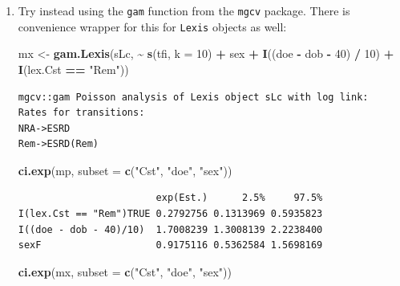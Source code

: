 \documentclass[
]{book}
\newenvironment{Shaded}{\begin{snugshade}}{\end{snugshade}}
\newcommand{\AttributeTok}[1]{\textcolor[rgb]{0.13,0.29,0.53}{#1}}
\newcommand{\DecValTok}[1]{\textcolor[rgb]{0.00,0.00,0.81}{#1}}
\newcommand{\FunctionTok}[1]{\textcolor[rgb]{0.13,0.29,0.53}{\textbf{#1}}}
\newcommand{\NormalTok}[1]{#1}
\newcommand{\OtherTok}[1]{\textcolor[rgb]{0.56,0.35,0.01}{#1}}
\newcommand{\SpecialCharTok}[1]{\textcolor[rgb]{0.81,0.36,0.00}{\textbf{#1}}}
\newcommand{\StringTok}[1]{\textcolor[rgb]{0.31,0.60,0.02}{#1}}
\theoremstyle{definition}
\theoremstyle{definition}
\theoremstyle{definition}
\theoremstyle{definition}
\theoremstyle{remark}
\begin{document}
\begin{enumerate}
  How does the effects of sex change from the Cox-model?
\item
  Try instead using the \texttt{gam} function from the
  \texttt{mgcv} package. There is convenience wrapper for this for
  \texttt{Lexis} objects as well:

\begin{Shaded}
\begin{Highlighting}[]
\NormalTok{mx }\OtherTok{\textless{}{-}} \FunctionTok{gam.Lexis}\NormalTok{(sLc,}
                \SpecialCharTok{\textasciitilde{}} \FunctionTok{s}\NormalTok{(tfi, }\AttributeTok{k =} \DecValTok{10}\NormalTok{) }\SpecialCharTok{+} 
\NormalTok{                  sex }\SpecialCharTok{+} \FunctionTok{I}\NormalTok{((doe }\SpecialCharTok{{-}}\NormalTok{ dob }\SpecialCharTok{{-}} \DecValTok{40}\NormalTok{) }\SpecialCharTok{/} \DecValTok{10}\NormalTok{) }\SpecialCharTok{+} 
                  \FunctionTok{I}\NormalTok{(lex.Cst }\SpecialCharTok{==} \StringTok{"Rem"}\NormalTok{))}
\end{Highlighting}
\end{Shaded}

\begin{verbatim}
mgcv::gam Poisson analysis of Lexis object sLc with log link:
Rates for transitions:
NRA->ESRD
Rem->ESRD(Rem)
\end{verbatim}

\begin{Shaded}
\begin{Highlighting}[]
\FunctionTok{ci.exp}\NormalTok{(mp, }\AttributeTok{subset =} \FunctionTok{c}\NormalTok{(}\StringTok{"Cst"}\NormalTok{, }\StringTok{"doe"}\NormalTok{, }\StringTok{"sex"}\NormalTok{))}
\end{Highlighting}
\end{Shaded}

\begin{verbatim}
                        exp(Est.)      2.5%     97.5%
I(lex.Cst == "Rem")TRUE 0.2792756 0.1313969 0.5935823
I((doe - dob - 40)/10)  1.7008239 1.3008139 2.2238400
sexF                    0.9175116 0.5362584 1.5698169
\end{verbatim}

\begin{Shaded}
\begin{Highlighting}[]
\FunctionTok{ci.exp}\NormalTok{(mx, }\AttributeTok{subset =} \FunctionTok{c}\NormalTok{(}\StringTok{"Cst"}\NormalTok{, }\StringTok{"doe"}\NormalTok{, }\StringTok{"sex"}\NormalTok{))}
\end{Highlighting}
\end{Shaded}


\end{enumerate}
\end{document}
